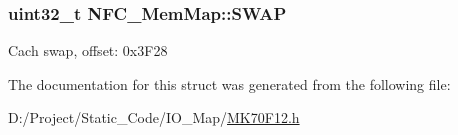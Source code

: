 \subsubsection[{S\+W\+A\+P}]{\setlength{\rightskip}{0pt plus 5cm}uint32\+\_\+t N\+F\+C\+\_\+\+Mem\+Map\+::\+S\+W\+A\+P}\label{struct_n_f_c___mem_map_acb4d1261ff3c34b54bc5c14496f742ac}
Cach swap, offset\+: 0x3\+F28 

The documentation for this struct was generated from the following file\+:\begin{DoxyCompactItemize}
\item 
D\+:/\+Project/\+Static\+\_\+\+Code/\+I\+O\+\_\+\+Map/\hyperlink{_m_k70_f12_8h}{M\+K70\+F12.\+h}\end{DoxyCompactItemize}
